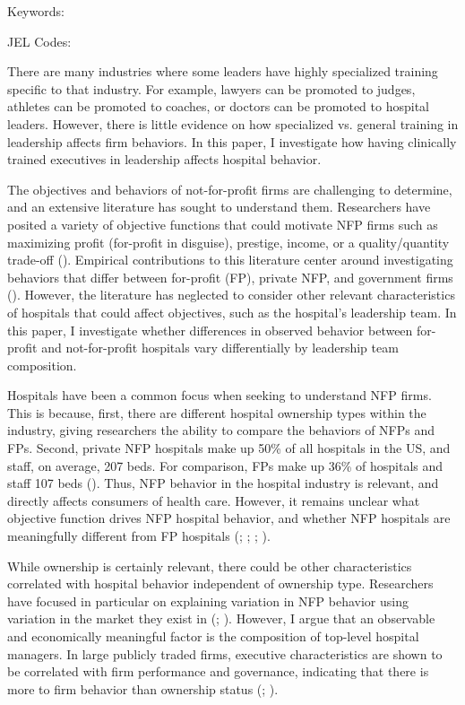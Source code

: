 \documentclass[12pt]{article}
\begin{document}
	\noindent Keywords: 
	
	\noindent JEL Codes: 
	
	\onehalfspacing
	
	\newpage

    There are many industries where some leaders have highly specialized training specific to that industry. For example, lawyers can be promoted to judges, athletes can be promoted to coaches, or doctors can be promoted to hospital leaders. However, there is little evidence on how specialized vs. general training in leadership affects firm behaviors. In this paper, I investigate how having clinically trained executives in leadership affects hospital behavior.  

  The objectives and behaviors of not-for-profit firms are challenging to determine, and an extensive literature has sought to understand them. Researchers have posited a variety of objective functions that could motivate NFP firms such as maximizing profit (for-profit in disguise), prestige, income, or a quality/quantity trade-off (\cite{steinberg1986revealed}). Empirical contributions to this literature center around investigating behaviors that differ between for-profit (FP), private NFP, and government firms (\cite{sloan2000not}). However, the literature has neglected to consider other relevant characteristics of hospitals that could affect objectives, such as the hospital's leadership team. In this paper, I investigate whether differences in observed behavior between for-profit and not-for-profit hospitals vary differentially by leadership team composition. 
  
  Hospitals have been a common focus when seeking to understand NFP firms. This is because, first, there are different hospital ownership types within the industry, giving researchers the ability to compare the behaviors of NFPs and FPs. Second, private NFP hospitals make up 50\% of all hospitals in the US, and staff, on average, 207 beds. For comparison, FPs make up 36\% of hospitals and staff 107 beds (\cite{ASPE_2023}). Thus, NFP behavior in the hospital industry is relevant, and directly affects consumers of health care. However, it remains unclear what objective function drives NFP hospital behavior, and whether NFP hospitals are meaningfully different from FP hospitals (\cite{sloan2000not}; \cite{erus2002inferring}; \cite{deneffe2002not}; \cite{horwitz2009hospital}). 
  
  While ownership is certainly relevant, there could be other characteristics correlated with hospital behavior independent of ownership type. Researchers have focused in particular on explaining variation in NFP behavior using variation in the market they exist in (\cite{duggan2002hospital}; \cite{horwitz2009hospital}). However, I argue that an observable and economically meaningful factor is the composition of top-level hospital managers. In large publicly traded firms, executive characteristics are shown to be correlated with firm performance and governance, indicating that there is more to firm behavior than ownership status (\cite{bertrand2003managing}; \cite{ahern2012changing}\cite{matsa2013female}). 
  
\end{document}
